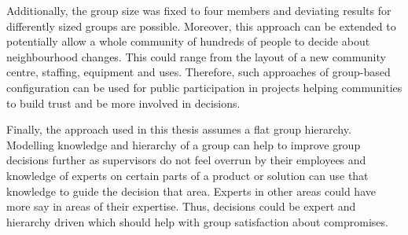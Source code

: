 Additionally, the group size was fixed to four members and deviating results for differently sized groups are possible. Moreover, this approach can be extended to potentially allow a whole community of hundreds of people to decide about neighbourhood changes. This could range from the layout of a new community centre, staffing, equipment and uses. Therefore, such approaches of group-based configuration can be used for public participation in projects helping communities to build trust and be more involved in decisions.

Finally, the approach used in this thesis assumes a flat group hierarchy. Modelling knowledge and hierarchy of a group can help to improve group decisions further as supervisors do not feel overrun by their employees and knowledge of experts on certain parts of a product or solution can use that knowledge to guide the decision that area. Experts in other areas could have more say in areas of their expertise. Thus, decisions could be expert and hierarchy driven which should help with group satisfaction about compromises.
